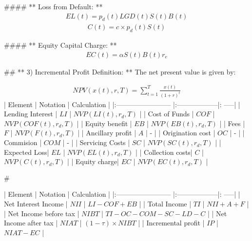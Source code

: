 \documentclass[12pt]{article}
\newcommand{\Z}{\mathbb{Z}}
\newenvironment{theorem}[2][Theorem]{\begin{trivlist}
\item[\hskip \labelsep {\bfseries #1}\hskip \labelsep {\bfseries #2.}]}{\end{trivlist}}
\begin{document}
#### ** Loss from Default: **
\begin{align}
EL(t) =  p_d(t)LGD(t)S(t)B(t) 
\end{align}
\begin{align}
C(t) = c\times p_d(t) S(t)
\end{align}

#### ** Equity Capital Charge: **
\begin{align}
 EC(t) =  \alpha S(t)B(t) r_e
\end{align}


## ** 3) Incremental Profit Definition: **
The net present value is given by:

\begin{align}
NPV(x(t),r,T)=\sum_{t=1}^T \frac{x(t)}{(1+r)^t}
\end{align}
| Element                 | Notation             | Calculation  |
|:------------------------ |:------------------|: -----|
| Lending Interest     | $LI$ | $NVP(LI(t),r_d,T)$ |
| Cost of Funds     | $COF$      |   $NVP(COF(t),r_d,T)$ |
| Equity benefit | $EB$      |    $NVP(EB(t),r_d,T)$ |
| Fees | $F$      |    $NVP(F(t),r_d,T)$ |
| Ancillary profit | $A$      |    - |
| Origination cost | $OC$      |    - |
| Commision | $COM$      |    - |
| Servicing Costs | $SC$      |    $NVP(SC(t),r_d,T)$ |
| Expected Loss| $EL$      |    $NVP(EL(t),r_d,T)$ |
| Collection costs| $C$      |    $NVP(C(t),r_d,T)$ |
| Equity charge| $EC$      |    $NVP(EC(t),r_d,T)$ |

# 

| Element                 | Notation             | Calculation  |
|:------------------------ |:------------------|: -----|
| Net Interest Income  | $NII$      |    $LI-COF+EB$ |
| Total Income  | $TI$      |    $NII+A+F$ |
| Net Income before tax | $NIBT$      |    $TI-OC-COM-SC-LD-C$ |
| Net Income after tax | $NIAT$      |    $(1-\tau)\times NIBT$ |
| Incremental profit | $IP$      |    $NIAT-EC$ |






 
 
 
\end{document}
